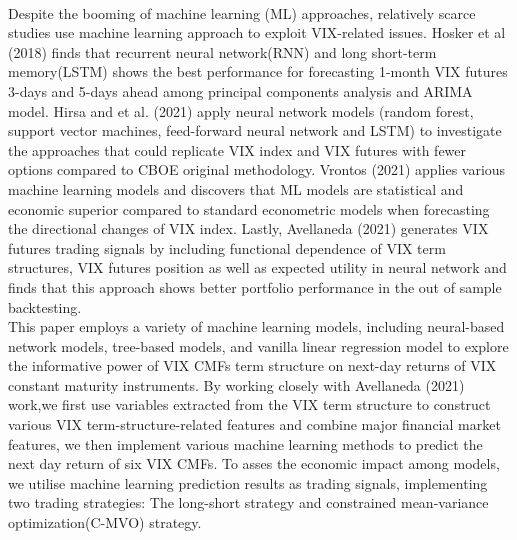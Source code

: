 \documentclass[10pt,letterpaper]{article}
\begin{document}
\\Despite the booming of machine learning (ML) approaches, relatively scarce studies use machine learning approach to exploit VIX-related issues. Hosker et al (2018) finds that recurrent neural network(RNN) and long short-term memory(LSTM) shows the best performance for forecasting 1-month VIX futures 3-days and 5-days ahead among principal components analysis and ARIMA model. Hirsa and et al. (2021) apply neural network models (random forest, support vector machines, feed-forward neural network and LSTM) to investigate the approaches that could replicate VIX index and VIX futures with fewer options compared to CBOE original methodology. Vrontos (2021) applies various machine learning models and discovers that ML models are statistical and economic superior compared to standard econometric models when forecasting the directional changes of VIX index. Lastly, Avellaneda (2021) generates VIX futures trading signals by including functional dependence of VIX term structures, VIX futures position as well as expected utility in neural network and finds that this approach shows better portfolio performance in the out of sample backtesting.
\\This paper employs a variety of machine learning models, including neural-based network models, tree-based models, and vanilla linear regression model to explore the informative power of VIX CMFs term structure on next-day returns of VIX constant maturity instruments. By working closely with Avellaneda (2021) work,we first use variables extracted from the VIX term structure to construct various VIX term-structure-related features and combine major financial market features, we then implement various machine learning methods to predict the next day return of six VIX CMFs. To asses the economic impact among models, we utilise machine learning prediction results as trading signals, implementing two trading strategies: The long-short strategy and constrained mean-variance optimization(C-MVO) strategy.
\end{document}
